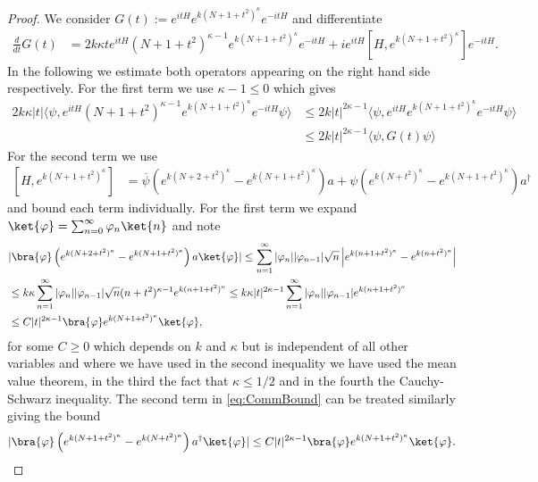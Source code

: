 \documentclass[11pt]{amsart}
\newcommand{\nn}{\nonumber}
\newcommand{\1}{\mathbbm{1}}
\theoremstyle{plain}
\theoremstyle{definition}
\theoremstyle{remark}
\numberwithin{equation}{section}
\begin{document}
\begin{proof}
We consider $G(t):=e^{itH} e^{k(N+1+t^2)^\kappa}e^{-itH}$ and differentiate 
\begin{align}
\label{eq:GoperatorDeriv}
    \frac{d}{dt}G(t) &=2k\kappa te^{itH} (N+1+t^2)^{\kappa-1} e^{k(N+1+t^2)^\kappa}e^{-itH} + ie^{itH} \left[H,e^{k(N+1+t^2)^\kappa}\right]e^{-itH}.
\end{align}
In the following we estimate both operators appearing on the right hand side respectively. For the first term we use $\kappa -1\le 0$ which gives
\begin{align}
\label{eq:FirstTermBound}
   \nn 2k\kappa|t|\langle \psi,e^{itH} (N+1+t^2)^{\kappa-1} e^{k(N+1+t^2)^\kappa}e^{-itH}\psi\rangle &\le 2k |t|^{2\kappa -1}\langle \psi,e^{itH}  e^{k(N+1+t^2)^\kappa}e^{-itH}\psi\rangle\nn\\&\le 2k |t|^{2\kappa -1}\langle \psi,G(t)\psi\rangle
\end{align}
For the second term we use
\begin{align}
\label{eq:CommBound}\left[H,e^{k(N+1+t^2)^\kappa}\right] &= \overline{\psi} \left(e^{k(N+2+t^2)^\kappa} -e^{k(N+1+t^2)^\kappa} \right)a + \psi \left(e^{k(N+t^2)^\kappa} -e^{k(N+1+t^2)^\kappa} \right)a^\dagger
\end{align}
and bound each term individually. For the first term we expand $\ket{\varphi} = \sum_{n=0}^{\infty} \varphi_n\ket{n}$ and note
\begin{align*}
    &|\bra{\varphi} \left(e^{k(N+2+t^2)^{\kappa}} -e^{k(N+1+t^2)^{\kappa}} \right)a\ket{\varphi}| \le  \sum_{n=1}^{\infty} |\varphi_{n}||\varphi_{n-1}| \sqrt{n}\left|e^{k(n+1+t^2)^{\kappa}} -e^{k(n+t^2)^{\kappa}} \right| \\ &\le k\kappa\sum_{n=1}^{\infty} |\varphi_{n}||\varphi_{n-1}| \sqrt{n} (n+t^2)^{\kappa-1}e^{k(n+1+t^2)^{\kappa}} \le k\kappa |t|^{2\kappa -1} \sum_{n=1}^{\infty} |\varphi_{n}||\varphi_{n-1}| e^{k(n+1+t^2)^{\kappa}}
    \\&\le C |t|^{2\kappa-1}\bra{\varphi} e^{k(N+1+t^2)^\kappa}\ket{\varphi}, 
\end{align*}
 for some $C\ge 0$ which depends on $k$ and $\kappa$ but is independent of all other variables and where we have used in the second inequality we have used the mean value theorem, in the third the fact that $\kappa \le 1/2$ and in the fourth the Cauchy-Schwarz inequality. The second term in \eqref{eq:CommBound} can be treated similarly giving the bound
 \begin{align*}
     |\bra{\varphi} \left(e^{k(N+1+t^2)^{\kappa}} -e^{k(N+t^2)^{\kappa}} \right)a^\dagger\ket{\varphi}| \le C|t|^{2\kappa-1} \bra{\varphi} e^{k(N+1+t^2)^\kappa}\ket{\varphi}.

\end{align*}
\end{proof}
\end{document}
